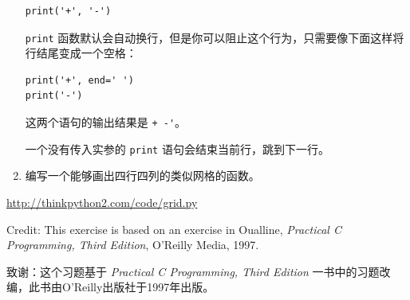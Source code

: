 \begin{exercise}
\begin{enumerate}
\begin{lstlisting}
print('+', '-')
\end{lstlisting}
%
\lstinline{print} 函数默认会自动换行，但是你可以阻止这个行为，只需要像下面这样将行结尾变成一个空格：

\begin{lstlisting}
print('+', end=' ')
print('-')
\end{lstlisting}
%

这两个语句的输出结果是 \lstinline{+ -'}。

一个没有传入实参的 \lstinline{print} 语句会结束当前行，跳到下一行。

\item 编写一个能够画出四行四列的类似网格的函数。

\end{enumerate}


\href{参考答案}{http://thinkpython2.com/code/grid.py}

Credit: This exercise is based on an exercise in Oualline, {\em
    Practical C Programming, Third Edition}, O'Reilly Media, 1997.

致谢：这个习题基于 {\em Practical C Programming, Third
Edition} 一书中的习题改编，此书由O’Reilly出版社于1997年出版。

\end{exercise}

